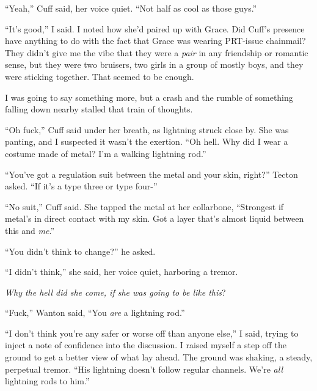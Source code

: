 ``Yeah,'' Cuff said, her voice quiet.  ``Not half as cool as those guys.''



``It's good,'' I said.  I noted how she'd paired up with Grace.  Did Cuff's presence have anything to do with the fact that Grace was wearing PRT-issue chainmail?  They didn't give me the vibe that they were a\emph{ pair }in any friendship or romantic sense, but they were two bruisers, two girls in a group of mostly boys, and they were sticking together.  That seemed to be enough.



I was going to say something more, but a crash and the rumble of something falling down nearby stalled that train of thoughts.



``Oh fuck,'' Cuff said under her breath, as lightning struck close by.  She was panting, and I suspected it wasn't the exertion.   ``Oh hell.  Why did I wear a costume made of metal?  I'm a walking lightning rod.''



``You've got a regulation suit between the metal and your skin, right?'' Tecton asked.  ``If it's a type three or type four-''



``No suit,'' Cuff said.  She tapped the metal at her collarbone, ``Strongest if metal's in direct contact with my skin.  Got a layer that's almost liquid between this and \emph{me}.''



``You didn't think to change?'' he asked.



``I didn't think,'' she said, her voice quiet, harboring a tremor.



\emph{Why the hell did she come, if she was going to be like this}?



``Fuck,'' Wanton said, ``You \emph{are} a lightning rod.''



``I don't think you're any safer or worse off than anyone else,'' I said, trying to inject a note of confidence into the discussion.  I raised myself a step off the ground to get a better view of what lay ahead.  The ground was shaking, a steady, perpetual tremor.  ``His lightning doesn't follow regular channels.  We're \emph{all} lightning rods to him.''




